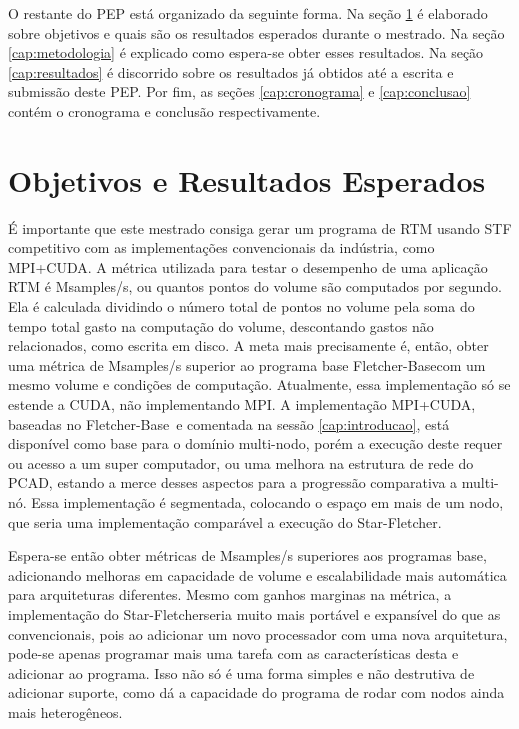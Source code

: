 \documentclass[ppgc,pep]{infufrgs}
\newcommand{\StarFletch}{Star-Fletcher}
\newcommand{\FletchBase}{Fletcher-Base}
\begin{document}
O restante do PEP está organizado da seguinte forma. Na seção \ref{cap:objetivos} é elaborado sobre objetivos e quais são os resultados esperados durante o mestrado. Na seção \ref{cap:metodologia} é explicado como espera-se obter esses resultados. Na seção \ref{cap:resultados} é discorrido sobre os resultados já obtidos até a escrita e submissão deste PEP. Por fim, as seções \ref{cap:cronograma} e \ref{cap:conclusao} contém o cronograma e conclusão respectivamente.


\chapter{Objetivos e Resultados Esperados}
\label{cap:objetivos}

É importante que este mestrado consiga gerar um programa de RTM usando STF competitivo com as implementações convencionais da indústria, como MPI+CUDA. A métrica utilizada para testar o desempenho de uma aplicação RTM é Msamples/s, ou quantos pontos do volume são computados por segundo. Ela é calculada dividindo o número total de pontos no volume pela soma do tempo total gasto na computação do volume, descontando gastos não relacionados, como escrita em disco. A meta mais precisamente é, então, obter uma métrica de Msamples/s superior ao programa base \FletchBase com um mesmo volume e condições de computação. Atualmente, essa implementação só se estende a CUDA, não implementando MPI. A implementação MPI+CUDA, baseadas no \FletchBase\ e comentada na sessão \ref{cap:introducao}, está disponível como base para o domínio multi-nodo, porém a execução deste requer ou acesso a um super computador, ou uma melhora na estrutura de rede do PCAD, estando a merce desses aspectos para a progressão comparativa a multi-nó. Essa implementação é segmentada, colocando o espaço em mais de um nodo, que seria uma implementação comparável a execução do \StarFletch.

Espera-se então obter métricas de Msamples/s superiores aos programas base, adicionando melhoras em capacidade de volume e escalabilidade mais automática para arquiteturas diferentes. Mesmo com ganhos marginas na métrica, a implementação do \StarFletch seria muito mais portável e expansível do que as convencionais, pois ao adicionar um novo processador com uma nova arquitetura, pode-se apenas programar mais uma tarefa com as características desta e adicionar ao programa. Isso não só é uma forma simples e não destrutiva de adicionar suporte, como dá a capacidade do programa de rodar com nodos ainda mais heterogêneos.
\end{document}
